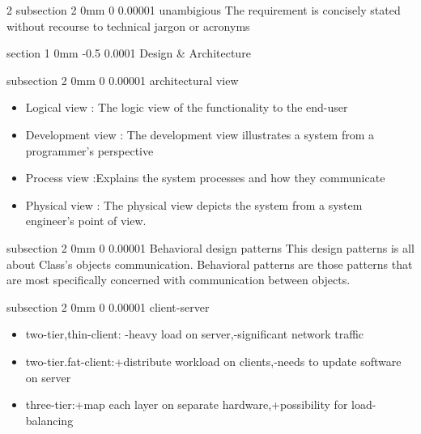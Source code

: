 \documentclass[a4paper,11pt]{article}
\makeatletter
\renewcommand{\section}{\@startsection
   {section}%
   {1}%
   {0mm}%
   {-0.5\baselineskip}%
   {0.0001\baselineskip}%
   {\sffamily\bfseries\upshape\normalsize}}%
\renewcommand{\subsection}{\@startsection
   {subsection}%
   {2}%
   {0mm}%
   {0\baselineskip}%
   {0.00001\baselineskip}%
   {\rmfamily\normalfont\slshape\normalsize}}%
\makeatother
\begin{document}
\begin{multicols}{2}
\subsection{unambigious}
The requirement is concisely stated without recourse to technical jargon or acronyms


\section{Design \& Architecture}

\subsection{architectural view}
\vspace{0 mm}
\begin{itemize}
 \setlength\itemsep{0em}
\item Logical view : The logic view of the functionality to the end-user
\item Development view : The development view illustrates a system from a programmer's perspective
\item Process view :Explains the system processes and how they communicate
\item Physical view : The physical view depicts the system from a system engineer's point of view.
\end{itemize}

\subsection{Behavioral design patterns}
This design patterns is all about Class's objects communication. Behavioral patterns are those patterns that are most specifically concerned with communication between objects.

 \subsection{client-server}
 \vspace{0 mm}
 \begin{itemize}
  \setlength\itemsep{0em}
\item two-tier,thin-client: -heavy load on server,-significant network traffic\\
\item two-tier.fat-client:+distribute workload on clients,-needs to update software on server
\item three-tier:+map each layer on separate hardware,+possibility for load-balancing
\end{itemize}


\end{multicols}
\end{document}
